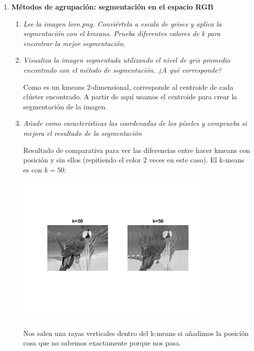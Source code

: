 \documentclass{article}
\begin{document}
\begin{enumerate}
\begin{enumerate}
 \end{enumerate}

\newpage

 \item \textbf{Métodos de agrupación: segmentación en el espacio RGB}

 \begin{enumerate}
 \item \textit{Lee  la  imagen   loro.png.  Conviértela  a  escala  de  grises  y  aplica  la 
segmentación  con  el  kmeans.  Prueba  diferentes  valores  de  k para 
encontrar la mejor segmentación.}

 \item \textit{Visualiza  la  imagen  segmentada  utilizando  el  nivel  de  gris  promedio 
encontrado con el método de segmentación. ¿A qué corresponde?}

 Como es un kmeans 2-dimensional, corresponde al centroide de cada clúster encontrado. A partir de aquí usamos el centroide para crear la segmentación de la imagen.

 \item \textit{Añade como características las coordenadas de los píxeles y comprueba si 
mejora el resultado de la segmentación}
  
	Resultado de comparativa para ver las diferencias entre hacer kmeans con posición y sin ellos (repitiendo el color 2 veces en este caso). El k-means es con $k=50$:
	
	\begin{center}
		\includegraphics[width=0.8\textwidth]{ej33-loroGray.png}
	\end{center}
	
	Nos salen una rayas verticales dentro del k-means si añadimos la posición cosa que no sabemos exactamente porque nos pasa.
	

\end{enumerate}
\end{enumerate}
\end{document}
